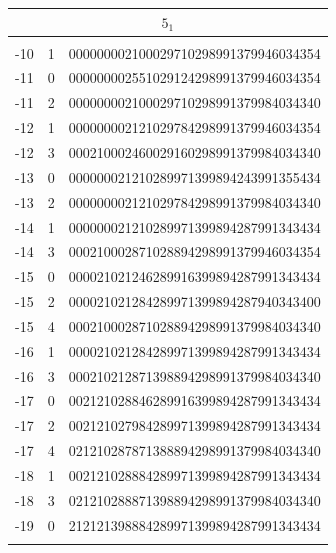 \documentclass{article}
\begin{document}
\begin{supertabular}[h]{c c r}
\hline 
{}                            \\
\hline \\[-3pt]
-10   & 1  & 000000002100029710298991379946034354  \\
-11   & 0  & 000000002551029124298991379946034354  \\
-11   & 2  & 000000002100029710298991379984034340  \\
-12   & 1  & 000000002121029784298991379946034354  \\
-12   & 3  & 000210002460029160298991379984034340  \\
-13   & 0  & 000000021210289971399894243991355434  \\
-13   & 2  & 000000002121029784298991379984034340  \\
-14   & 1  & 000000021210289971399894287991343434  \\
-14   & 3  & 000210002871028894298991379946034354  \\
-15   & 0  & 000021021246289916399894287991343434  \\
-15   & 2  & 000021021284289971399894287940343400  \\
-15   & 4  & 000210002871028894298991379984034340  \\
-16   & 1  & 000021021284289971399894287991343434  \\
-16   & 3  & 000210212871398894298991379984034340  \\
-17   & 0  & 002121028846289916399894287991343434  \\
-17   & 2  & 002121027984289971399894287991343434  \\
-17   & 4  & 021210287871388894298991379984034340  \\
-18   & 1  & 002121028884289971399894287991343434  \\
-18   & 3  & 021210288871398894298991379984034340  \\
-19   & 0  & 212121398884289971399894287991343434  \\
\\[-5pt]


\end{supertabular}
\end{document}
